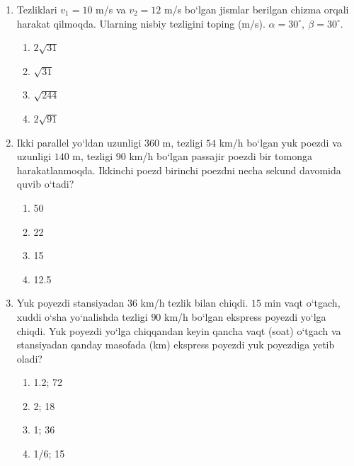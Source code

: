 \begin{enumerate}
\begin{enumerate}[label=\Alph*)]
\end{enumerate}


\item Tezliklari $v_1=10$ m/s va $v_2=12$ m/s bo‘lgan jismlar berilgan chizma orqali harakat qilmoqda.
Ularning nisbiy tezligini toping (m/s). $\alpha=30^\circ,\ \beta=30^\circ$.



\begin{enumerate}[label=\Alph*)]
\item $2\sqrt{31}$
\item $\sqrt{31}$
\item $\sqrt{244}$
\item $2\sqrt{91}$

\end{enumerate}


\item Ikki parallel yo‘ldan uzunligi $360$ m,
tezligi $54$ km/h bo‘lgan yuk poezdi va
uzunligi $140$ m, tezligi $90$ km/h bo‘lgan
passajir poezdi bir tomonga harakatlanmoqda.
Ikkinchi poezd birinchi poezdni necha sekund davomida quvib o‘tadi?

\begin{enumerate}[label=\Alph*)]
\item 50
\item 22
\item 15
\item 12.5

\end{enumerate}


\item Yuk poyezdi stansiyadan $36$ km/h tezlik bilan chiqdi.
$15$ min vaqt o‘tgach, xuddi o‘sha yo‘nalishda tezligi
$90$ km/h bo‘lgan ekspress poyezdi yo‘lga chiqdi. Yuk poyezdi yo‘lga chiqqandan keyin qancha vaqt (soat) o‘tgach va stansiyadan qanday masofada (km) ekspress poyezdi yuk poyezdiga yetib oladi?

\begin{enumerate}[label=\Alph*)]
\item 1.2; 72
\item 2; 18
\item 1; 36
\item 1/6; 15


\end{enumerate}
\end{enumerate}
